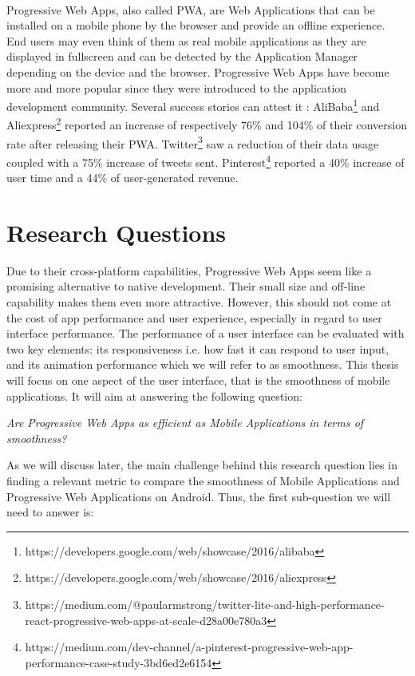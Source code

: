 \documentclass{kththesis}
\begin{document}
\paragraph{}
Progressive Web Apps, also called PWA, are Web Applications that can be installed on a mobile phone by the browser and provide an offline experience. End users may even think of them as real mobile applications as they are displayed in fullscreen and can be detected by the Application Manager depending on the device and the browser.
Progressive Web Apps have become more and more popular since they were introduced to the application development community. Several success stories can attest it : AliBaba\footnote{https://developers.google.com/web/showcase/2016/alibaba} and Aliexpress\footnote{https://developers.google.com/web/showcase/2016/aliexpress} reported an increase of respectively 76\% and 104\% of their conversion rate after releasing their PWA. Twitter\footnote{https://medium.com/@paularmstrong/twitter-lite-and-high-performance-react-progressive-web-apps-at-scale-d28a00e780a3} saw a reduction of their data usage coupled with a 75\% increase of tweets sent. Pinterest\footnote{https://medium.com/dev-channel/a-pinterest-progressive-web-app-performance-case-study-3bd6ed2e6154} reported a 40\% increase of user time and a 44\% of user-generated revenue. 



\section{Research Questions}

Due to their cross-platform capabilities, Progressive Web Apps seem like a promising alternative to native development. Their small size and off-line capability makes them even more attractive. However, this should not come at the cost of app performance and user experience, especially in regard to user interface performance. The performance of a user interface can be evaluated with two key elements: its responsiveness i.e. how fast it can respond to user input, and its animation performance which we will refer to as smoothness. 
This thesis will focus on one aspect of the user interface, that is the smoothness of mobile applications. It will aim at answering the following question: 
\begin{center}
    \textit{Are Progressive Web Apps as efficient as Mobile Applications in terms of smoothness?}
\end{center}
As we will discuss later, the main challenge behind this research question lies in finding a relevant metric to compare the smoothness of Mobile Applications and Progressive Web Applications on Android. Thus, the first sub-question we will need to answer is: \newline
\end{document}
